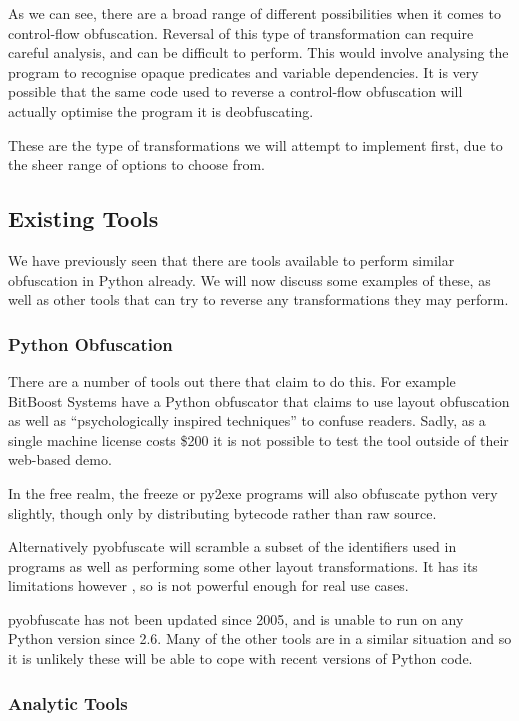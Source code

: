 \documentclass[twoside,a4paper]{report}
\begin{document}
As we can see, there are a broad range of different possibilities when it comes to control-flow obfuscation. Reversal of this type
of transformation can require careful analysis, and can be difficult to perform. This would involve analysing the program to recognise
opaque predicates and variable dependencies. It is very possible that the same code used to reverse a control-flow obfuscation will
actually optimise the program it is deobfuscating.

These are the type of transformations we will attempt to implement first, due to the sheer range of options to choose from.

\subsection{Existing Tools}

We have previously seen that there are tools available to perform similar obfuscation in Python already. We will now discuss some
examples of these, as well as other tools that can try to reverse any transformations they may perform.

\subsubsection{Python Obfuscation}

There are a number of tools out there that claim to do this. For example BitBoost Systems have a Python obfuscator \cite{bitboost}
that claims to use layout obfuscation as well as ``psychologically inspired techniques'' to confuse readers. Sadly, as a
single machine license costs \$200 it is not possible to test the tool outside of their web-based demo.

In the free realm, the freeze \cite{freezereadme} or py2exe \cite{py2exe} programs will also obfuscate python very slightly,
though only by distributing bytecode rather than raw source.

Alternatively pyobfuscate \cite{pyobf} will scramble a subset of the identifiers used in programs as well as performing
some other layout transformations. It has its limitations however \cite{pyobf}, so is not powerful enough for real use cases.

pyobfuscate has not been updated since 2005, and is unable to run on any Python version since 2.6. Many of the other tools are in
a similar situation and so it is unlikely these will be able to cope with recent versions of Python code.

\subsubsection{Analytic Tools}
\end{document}
